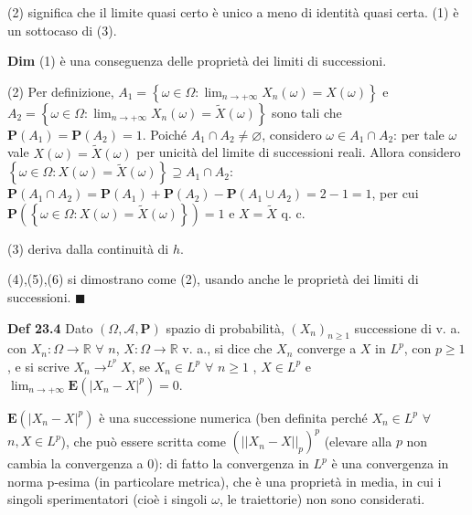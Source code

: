 \documentclass{article}
\begin{document}
(2) significa che il limite quasi certo \`{e} unico a meno di identit\`{a}
quasi certa. (1) \`{e} un sottocaso di (3).

\textbf{Dim} (1) \`{e} una conseguenza delle propriet\`{a} dei limiti di
successioni.

(2) Per definizione, $A_{1}=\left\{ \omega \in \Omega :\lim_{n\rightarrow
+\infty }X_{n}\left( \omega \right) =X\left( \omega \right) \right\} $ e $%
A_{2}=\left\{ \omega \in \Omega :\lim_{n\rightarrow +\infty }X_{n}\left(
\omega \right) =\tilde{X}\left( \omega \right) \right\} $ sono tali che $%
\mathbf{P}\left( A_{1}\right) =\mathbf{P}\left( A_{2}\right) =1$. Poich\'{e} 
$A_{1}\cap A_{2}\neq \varnothing $, considero $\omega \in A_{1}\cap A_{2}$:
per tale $\omega $ vale $X\left( \omega \right) =\tilde{X}\left( \omega
\right) $ per unicit\`{a} del limite di successioni reali. Allora considero $%
\left\{ \omega \in \Omega :X\left( \omega \right) =\tilde{X}\left( \omega
\right) \right\} \supseteq A_{1}\cap A_{2}$: $\mathbf{P}\left( A_{1}\cap
A_{2}\right) =\mathbf{P}\left( A_{1}\right) +\mathbf{P}\left( A_{2}\right) -%
\mathbf{P}\left( A_{1}\cup A_{2}\right) =2-1=1$, per cui $\mathbf{P}\left(
\left\{ \omega \in \Omega :X\left( \omega \right) =\tilde{X}\left( \omega
\right) \right\} \right) =1$ e $X=\tilde{X}$ q. c.

(3) deriva dalla continuit\`{a} di $h$.

(4),(5),(6) si dimostrano come (2), usando anche le propriet\`{a} dei limiti
di successioni. $\blacksquare $

\textbf{Def 23.4} Dato $\left( \Omega ,\mathcal{A},\mathbf{P}\right) $
spazio di probabilit\`{a}, $\left( X_{n}\right) _{n\geq 1}$ successione di
v. a. con $X_{n}:\Omega \rightarrow 
\mathbb{R}
$ $\forall $ $n$, $X:\Omega \rightarrow 
\mathbb{R}
$ v. a., si dice che $X_{n}$ converge a $X$ in $L^{p}$, con $p\geq 1$, e si
scrive $X_{n}\rightarrow ^{L^{p}}X$, se $X_{n}\in L^{p}$ $\forall $ $n\geq 1$%
, $X\in L^{p}$ e $\lim_{n\rightarrow +\infty }\mathbf{E}\left( \left\vert
X_{n}-X\right\vert ^{p}\right) =0$.

$\mathbf{E}\left( \left\vert X_{n}-X\right\vert ^{p}\right) $ \`{e} una
successione numerica (ben definita perch\'{e} $X_{n}\in L^{p}$ $\forall $ $%
n,X\in L^{p}$), che pu\`{o} essere scritta come $\left( \left\vert
\left\vert X_{n}-X\right\vert \right\vert _{p}\right) ^{p}$ (elevare alla $p$
non cambia la convergenza a $0$): di fatto la convergenza in $L^{p}$ \`{e}
una convergenza in norma p-esima (in particolare metrica), che \`{e} una
propriet\`{a} in media, in cui i singoli sperimentatori (cio\`{e} i singoli $%
\omega $, le traiettorie) non sono considerati.
\end{document}
